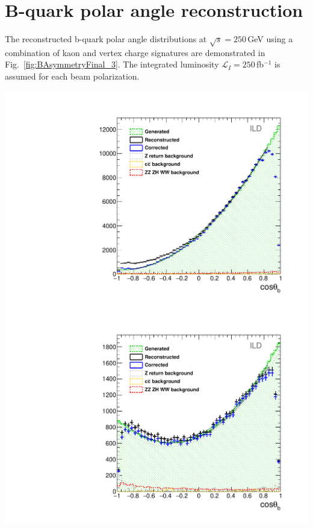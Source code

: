 

\section*{B-quark polar angle reconstruction}

The reconstructed b-quark polar angle distributions at $\sqrt{s} = 250$\,GeV using a combination of kaon and vertex charge signatures are demonstrated in Fig.~\ref{fig:BAsymmetryFinal_3}. The integrated luminosity $\mathcal{L}_I = 250$\,fb$^{-1}$ is assumed for each beam polarization.
\begin{center}\vspace{1cm}

	\includegraphics[width=0.4\linewidth]{plots/basymmetry-left-ild.pdf}
	\includegraphics[width=0.4\linewidth]{plots/basymmetry-right-ild.pdf}
		\label{fig:BAsymmetryFinal_3}
\end{center}\vspace{1cm}
